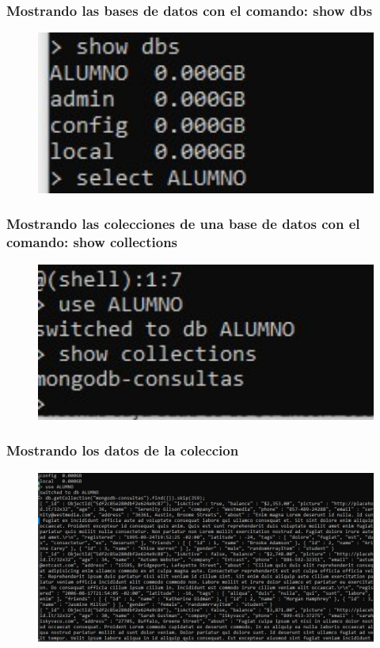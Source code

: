\documentclass[preprint,12pt]{elsarticle}
\begin{document}
\subsubsection{\textbf{Mostrando las bases de datos con el comando: show dbs}}
\begin{figure}[H]
	\begin{center}
		\includegraphics[width=12cm]{./IMAGENES/5} 
	\end{center}
\end{figure}
\subsubsection{\textbf{Mostrando las colecciones de una base de datos con el comando: show collections}}
\begin{figure}[H]
	\begin{center}
		\includegraphics[width=12cm]{./IMAGENES/6} 
	\end{center}
\end{figure}
\subsubsection{\textbf{Mostrando los datos de la coleccion}}
\begin{figure}[H]
	\begin{center}
		\includegraphics[width=12cm]{./IMAGENES/7} 
	\end{center}
\end{figure}
\end{document}
